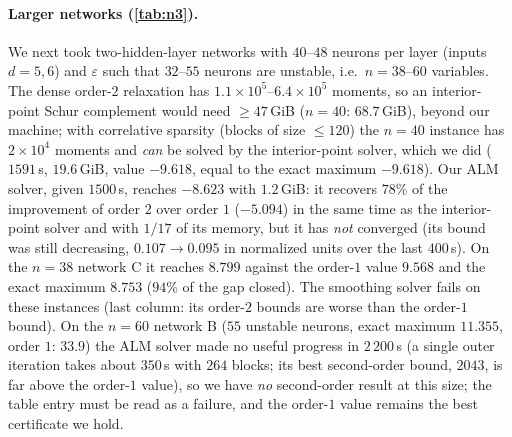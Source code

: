 \documentclass[a4paper,11pt]{article}
\theoremstyle{plain}
\theoremstyle{definition}
\theoremstyle{remark}
\begin{document}
\paragraph{Larger networks (\cref{tab:n3}).} We next took two-hidden-layer networks with $40$--$48$ neurons per layer (inputs $d=5,6$) and $\varepsilon$ such that $32$--$55$ neurons are unstable, i.e.\ $n=38$--$60$ variables. The dense order-$2$ relaxation has $1.1\times10^5$--$6.4\times10^5$ moments, so an interior-point Schur complement would need $\ge47$\,GiB ($n=40$: $68.7$\,GiB), beyond our machine; with correlative sparsity (blocks of size $\le120$) the $n=40$ instance has $2\times10^4$ moments and \emph{can} be solved by the interior-point solver, which we did ($1591$\,s, $19.6$\,GiB, value $-9.618$, equal to the exact maximum $-9.618$). Our ALM solver, given $1500$\,s, reaches $-8.623$ with $1.2$\,GiB: it recovers $78\%$ of the improvement of order $2$ over order $1$ ($-5.094$) in the same time as the interior-point solver and with $1/17$ of its memory, but it has \emph{not} converged (its bound was still decreasing, $0.107\to0.095$ in normalized units over the last $400$\,s). On the $n=38$ network C it reaches $8.799$ against the order-$1$ value $9.568$ and the exact maximum $8.753$ ($94\%$ of the gap closed). The smoothing solver fails on these instances (last column: its order-$2$ bounds are worse than the order-$1$ bound). On the $n=60$ network B ($55$ unstable neurons, exact maximum $11.355$, order $1$: $33.9$) the ALM solver made no useful progress in $2\,200$\,s (a single outer iteration takes about $350$\,s with $264$ blocks; its best second-order bound, $2043$, is far above the order-$1$ value), so we have \emph{no} second-order result at this size; the table entry must be read as a failure, and the order-$1$ value remains the best certificate we hold. 
\begin{table}[t]\centering\scriptsize
\setlength{\tabcolsep}{3pt}

\caption{Larger verification problems; $\varepsilon$ fixed so that many neurons are unstable. ``Order 2 sparse'' uses the correlative-sparsity cliques of the network. Negative = robust. The last column is the best bound of the smoothing solver within the same budget.}\label{tab:n3}
\end{table}
\end{document}
